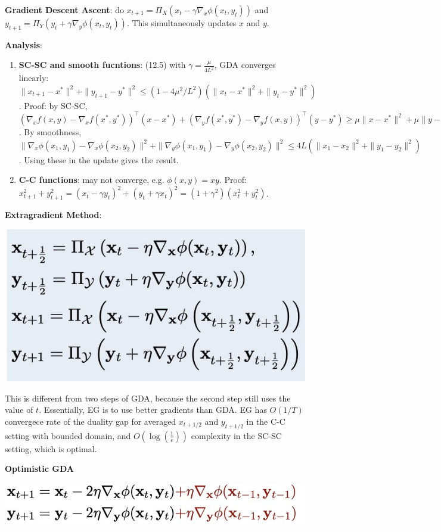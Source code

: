 \textbf{Gradient Descent Ascent}: do $x_{t+1} = \Pi_X(x_t - \gamma \nabla_x \phi(x_t, y_t))$ and $y_{t+1} = \Pi_Y (y_t + \gamma \nabla_y \phi(x_t, y_t))$. This simultaneously updates $x$ and $y$.

\textbf{Analysis}:
\begin{enumerate}
    \item \textbf{SC-SC and smooth fucntions}: (12.5) with $\gamma = \frac{\mu}{4L^2}$, GDA converges linearly: $\|x_{t+1} - x^*\|^2 + \|y_{t+1} - y^*\|^2 \le (1-4\mu^2/L^2)(\|x_t - x^*\|^2 + \|y_t - y^*\|^2)$. Proof: by SC-SC, $(\nabla_x f(x,y) - \nabla_x f(x^*, y^*))^\top (x - x^*) + (\nabla_y f(x^*, y^*) - \nabla_y f(x,y))^\top (y-y^*) \ge \mu\|x - x^*\|^2 + \mu\|y-y^*\|^2$. By smoothness, $\|\nabla_x \phi(x_1, y_1) - \nabla_x \phi(x_2, y_2)\|^2 + \|\nabla_y \phi(x_1, y_1) - \nabla_y \phi(x_2, y_2)\|^2 \le 4L(\|x_1 - x_2\|^2 + \|y_1 - y_2\|^2)$. Using these in the update gives the result.
    \item \textbf{C-C functions}: may not converge, e.g. $\phi(x,y) = xy$. Proof: $x_{t+1}^2 + y_{t+1}^2 = (x_t - \gamma y_t)^2 + (y_t + \gamma x_t)^2 = (1+\gamma^2)(x_t^2 + y_t^2)$.
\end{enumerate}

\textbf{Extragradient Method}: 

\includegraphics[width=\linewidth]{imgs/EG.jpg}

This is different from two steps of GDA, because the second step still uses the value of $t$. Essentially, EG is to use better gradients than GDA. EG has $O(1/T)$ convergece rate of the duality gap for averaged $x_{t+1/2}$ and $y_{t+1/2}$ in the C-C setting with bounded domain, and $O(\log(\frac{1}{\epsilon}))$ complexity in the SC-SC setting, which is optimal.

\textbf{Optimistic GDA}

\includegraphics[width=\linewidth]{imgs/OGDA.jpg}

